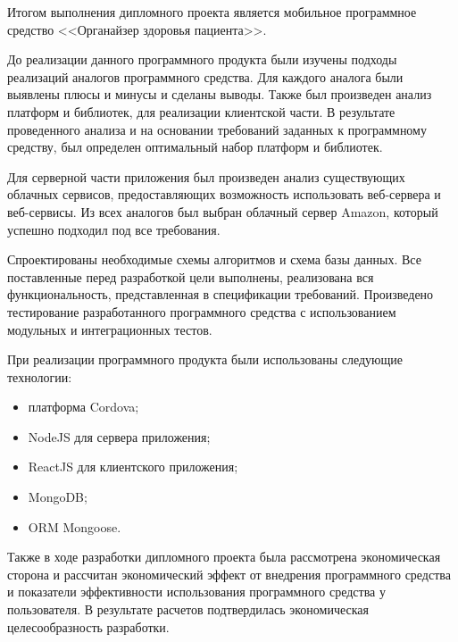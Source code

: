 
Итогом выполнения дипломного проекта является мобильное программное средство <<Органайзер здоровья пациента>>.

До реализации данного программного продукта были изучены подходы реализаций аналогов программного средства. Для каждого аналога были выявлены плюсы и минусы и сделаны выводы. Также был произведен анализ платформ и библиотек, для реализации клиентской части. В результате проведенного анализа и на основании требований заданных к программному средству, был определен оптимальный набор платформ и библиотек.

Для серверной части приложения был произведен анализ существующих облачных сервисов, предоставляющих возможность использовать веб-сервера и веб-сервисы. Из всех аналогов был выбран облачный сервер Amazon, который успешно подходил под все требования.

Спроектированы необходимые схемы алгоритмов и схема базы данных. Все поставленные перед разработкой цели выполнены, реализована вся функциональность, представленная в спецификации требований. Произведено тестирование разработанного программного средства с использованием модульных и интеграционных тестов.

При реализации программного продукта были использованы следующие технологии:

\begin{itemize}
  \item платформа Cordova;
  \item NodeJS для сервера приложения;
  \item ReactJS для клиентского приложения;
  \item MongoDB;
  \item ORM Mongoose.
\end{itemize}

Также в ходе разработки дипломного проекта была рассмотрена экономическая сторона и рассчитан экономический эффект от внедрения программного средства и показатели эффективности использования программного средства у пользователя. В результате расчетов подтвердилась экономическая целесообразность разработки. 